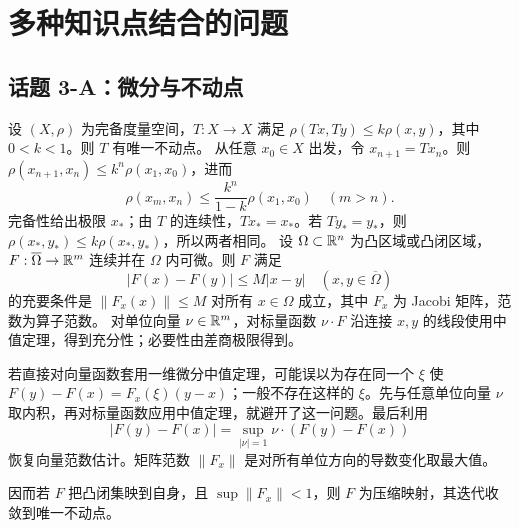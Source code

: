 \section{多种知识点结合的问题}
\subsection*{话题 3-A：微分与不动点}
设 $(X,\rho)$ 为完备度量空间，$T:X\to X$ 满足 $\rho(Tx,Ty)\le k\rho(x,y)$，其中 $0<k<1$。则 $T$ 有唯一不动点。
\pf 从任意 $x_0\in X$ 出发，令 $x_{n+1}=Tx_n$。则 $\rho(x_{n+1},x_n)\le k^n\rho(x_1,x_0)$，进而
\[\rho(x_m,x_n)\le\frac{k^n}{1-k}\rho(x_1,x_0)\quad(m>n).\]
完备性给出极限 $x_*$；由 $T$ 的连续性，$Tx_*=x_*$。若 $Ty_*=y_*$，则 $\rho(x_*,y_*)\le k\rho(x_*,y_*)$，所以两者相同。
设 $\Omega\subset\mathbb R^n$ 为凸区域或凸闭区域，$F:\overline\Omega\to\mathbb R^m$ 连续并在 $\Omega$ 内可微。则 $F$ 满足
\[|F(x)-F(y)|\le M|x-y|\quad(x,y\in\overline\Omega)\]
的充要条件是 $\|F_x(x)\|\le M$ 对所有 $x\in\Omega$ 成立，其中 $F_x$ 为 Jacobi 矩阵，范数为算子范数。
\pf 对单位向量 $\nu\in\mathbb R^m$，对标量函数 $\nu\cdot F$ 沿连接 $x,y$ 的线段使用中值定理，得到充分性；必要性由差商极限得到。
\par 若直接对向量函数套用一维微分中值定理，可能误以为存在同一个 $\xi$ 使 $F(y)-F(x)=F_x(\xi)(y-x)$；一般不存在这样的 $\xi$。先与任意单位向量 $\nu$ 取内积，再对标量函数应用中值定理，就避开了这一问题。最后利用
\[|F(y)-F(x)|=\sup_{|\nu|=1}\nu\cdot(F(y)-F(x))\]
恢复向量范数估计。矩阵范数 $\|F_x\|$ 是对所有单位方向的导数变化取最大值。
\par 因而若 $F$ 把凸闭集映到自身，且 $\sup\|F_x\|<1$，则 $F$ 为压缩映射，其迭代收敛到唯一不动点。


